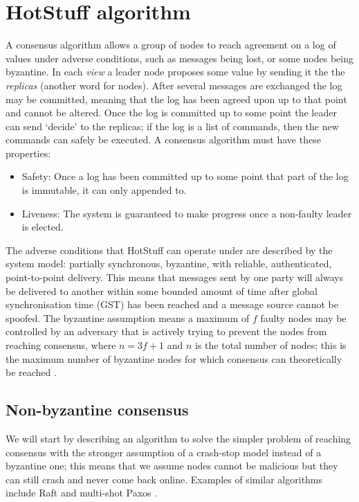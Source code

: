 
\section{HotStuff algorithm} \label{hotstufftheory}
A consensus algorithm allows a group of nodes to reach agreement on a log of values under adverse conditions, such as messages being lost, or some nodes being byzantine. In each \textit{view} a leader node proposes some value by sending it the the \textit{replicas} (another word for nodes). After several messages are exchanged the log may be committed, meaning that the log has been agreed upon up to that point and cannot be altered. Once the log is committed up to some point the leader can send `decide' to the replicas; if the log is a list of commands, then the new commands can safely be executed. A consensus algorithm must have these properties:
\begin{itemize}
	\item Safety: Once a log has been committed up to some point that part of the log is immutable, it can only appended to.
	\item Liveness: The system is guaranteed to make progress once a non-faulty leader is elected.
\end{itemize}

The adverse conditions that HotStuff can operate under are described by the system model: partially synchronous, byzantine, with reliable, authenticated, point-to-point delivery. This means that messages sent by one party will always be delivered to another within some bounded amount of time after global synchronisation time (GST) has been reached and a message source cannot be spoofed. The byzantine assumption means a maximum of $f$ faulty nodes may be controlled by an adversary that is actively trying to prevent the nodes from reaching consensus, where $n = 3f + 1$ and $n$ is the total number of nodes; this is the maximum number of byzantine nodes for which consensus can theoretically be reached \cite{pease_reaching_1980}\cite{fischer_easy_nodate}.

\subsection{Non-byzantine consensus}
We will start by describing an algorithm to solve the simpler problem of reaching consensus with the stronger assumption of a crash-stop model instead of a byzantine one; this means that we assume nodes cannot be malicious but they can still crash and never come back online. Examples of similar algorithms include Raft \cite{ongaro_search_nodate} and multi-shot Paxos \cite{lamport_part-time_1998}\cite{lamport_paxos_2001}.

